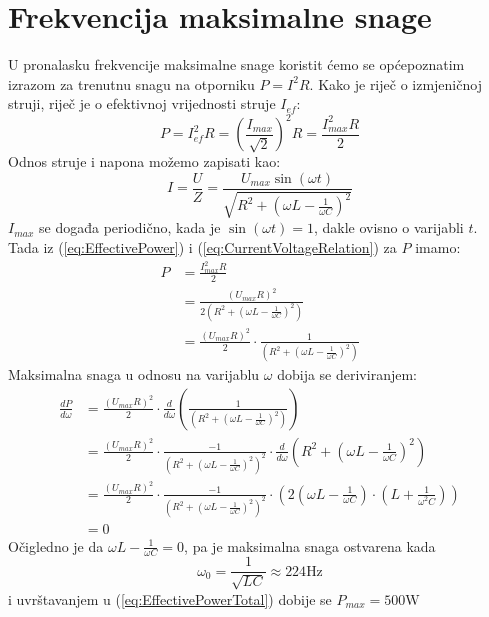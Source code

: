 \documentclass{article}
\let\oldref\ref
\renewcommand{\ref}[1]{(\oldref{#1})}
\begin{document}
\section*{Frekvencija maksimalne snage}
U pronalasku frekvencije maksimalne snage koristit ćemo se općepoznatim izrazom za trenutnu snagu na otporniku $P = I^2R$. Kako je riječ o izmjeničnoj struji, riječ je o efektivnoj vrijednosti struje $I_{ef}$:
\begin{equation}
  \label{eq:EffectivePower}
  P = I_{ef}^2R = \left(\frac{I_{max}}{\sqrt{2}}\right)^2R = \frac{I_{max}^2R}{2}
\end{equation}
Odnos struje i napona možemo zapisati kao:
\begin{equation}
  \label{eq:CurrentVoltageRelation}
  I = \frac{U}{Z} = \frac{U_{max}\sin(\omega t)}{\sqrt{R^2 + (\omega L - \frac{1}{\omega C})^2}}
\end{equation}
$I_{max}$ se događa periodično, kada je $\sin(\omega t) = 1$, dakle ovisno o varijabli $t$.\\Tada iz \ref{eq:EffectivePower} i \ref{eq:CurrentVoltageRelation} za $P$ imamo:
\begin{align}
  P & = \frac{I_{max}^2R}{2}                                                                                   \\
    & = \frac{\left(U_{max}R\right)^2}{2\left(R^2 + (\omega L - \frac{1}{\omega C})^2\right)}                  \\
  \label{eq:EffectivePowerTotal}
    & = \frac{\left(U_{max}R\right)^2}{2} \cdot \frac{1}{\left(R^2 + (\omega L - \frac{1}{\omega C})^2\right)}
\end{align}
Maksimalna snaga u odnosu na varijablu $\omega$ dobija se deriviranjem:
\begin{align}
  \frac{dP}{d\omega} & = \frac{\left(U_{max}R\right)^2}{2} \cdot \frac{d}{d\omega}\left(\frac{1}{\left(R^2 + (\omega L - \frac{1}{\omega C})^2\right)}\right)                                                          \\
                     & = \frac{\left(U_{max}R\right)^2}{2} \cdot \frac{-1}{\left(R^2 + (\omega L - \frac{1}{\omega C})^2\right)^2} \cdot \frac{d}{d\omega}\left(R^2 + (\omega L - \frac{1}{\omega C})^2\right)         \\
                     & = \frac{\left(U_{max}R\right)^2}{2} \cdot \frac{-1}{\left(R^2 + (\omega L - \frac{1}{\omega C})^2\right)^2} \cdot \left(2(\omega L - \frac{1}{\omega C})\cdot (L + \frac{1}{\omega^2C}) \right) \\
                     & = 0
\end{align}
Očigledno je da $\omega L - \frac{1}{\omega C} = 0$, pa je maksimalna snaga ostvarena kada
\begin{equation}
  \omega_0 = \frac{1}{\sqrt{LC}} \approx 224\text{Hz}
\end{equation}
i uvrštavanjem u \ref{eq:EffectivePowerTotal} dobije se $P_{max} = 500\text{W}$
\end{document}
